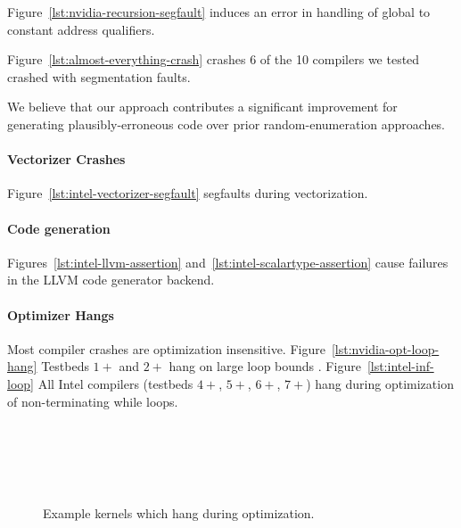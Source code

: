 Figure~\ref{lst:nvidia-recursion-segfault} induces an error in handling of global to constant address qualifiers.

Figure~\ref{lst:almost-everything-crash} crashes 6 of the 10 compilers we tested crashed with segmentation faults.

We believe that our approach contributes a significant improvement for generating plausibly-erroneous code over prior random-enumeration approaches.

\paragraph{Vectorizer Crashes} Figure~\ref{lst:intel-vectorizer-segfault} segfaults during vectorization. 


\paragraph{Code generation} Figures~\ref{lst:intel-llvm-assertion} and~\ref{lst:intel-scalartype-assertion} cause failures in the LLVM code generator backend.


\paragraph{Optimizer Hangs} Most compiler crashes are optimization insensitive.  Figure~\ref{lst:nvidia-opt-loop-hang} Testbeds $1+$ and $2+$ hang on large loop bounds . Figure~\ref{lst:intel-inf-loop} All Intel compilers (testbeds $4+$, $5+$, $6+$, $7+$) hang during optimization of non-terminating while loops.

\begin{figure}
  \centering %
  \\%
  \\%
  \\%
  \\%
  \caption{Example kernels which hang during optimization.}%
  \label{lst:compiler-hangs}%
\end{figure}


